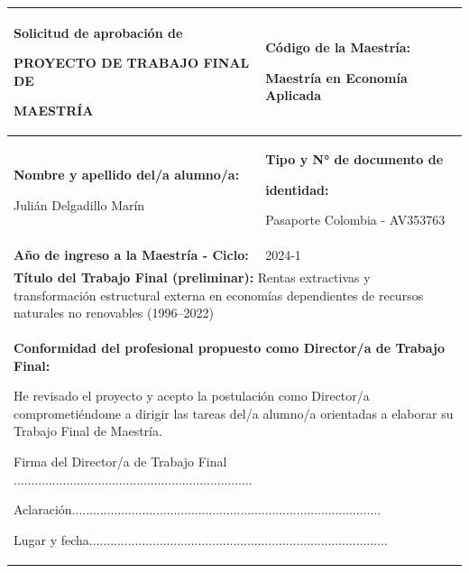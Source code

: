 \documentclass[../../PTFM.tex]{subfiles}
\begin{document}
\thispagestyle{empty}
\color{black}
\setlength{\arrayrulewidth}{0.6pt}
\setlength{\tabcolsep}{8pt}
\renewcommand{\arraystretch}{1.25}

\begin{center}
\small

\begin{tabular}{|p{}|p{}|}
\hline
{\Large\bfseries Solicitud de aprobación de\par PROYECTO DE TRABAJO FINAL DE\par MAESTRÍA}
&
{\normalsize\textbf{Código de la Maestría:}\par\vspace{0.8em}Maestría en Economía Aplicada}
\\[1.0em]
\hline
\textbf{Nombre y apellido del/a alumno/a:}\par
\vspace{0.45em}
Julián Delgadillo Marín
&
\textbf{Tipo y N° de documento de}\par
\textbf{identidad:}\par
Pasaporte Colombia - AV353763
\\[0.35em]
\hline
\textbf{Año de ingreso a la Maestría - Ciclo:}
&
2024-1
\\[2.0em]
\hline
\multicolumn{2}{|p{0.94\textwidth}|}{
\textbf{Título del Trabajo Final (preliminar):} Rentas extractivas y transformación estructural externa en economías dependientes de recursos naturales no renovables (1996–2022)
}
\\[2.0em]
\hline
\multicolumn{2}{|p{0.94\textwidth}|}{
\textbf{Conformidad del profesional propuesto como Director/a de Trabajo Final:}
\par\vspace{0.8em}
{\large He revisado el proyecto y acepto la postulación como Director/a comprometiéndome a dirigir las tareas del/a alumno/a orientadas a elaborar su Trabajo Final de Maestría.}
\par\vspace{1.8em}
{\footnotesize Firma del Director/a de Trabajo Final ....................................................................}
\par\vspace{1.2em}
{\footnotesize Aclaración........................................................................................}
\par\vspace{1.2em}
{\footnotesize Lugar y fecha.....................................................................................}
}
\end{tabular}
\end{center}
\end{document}
